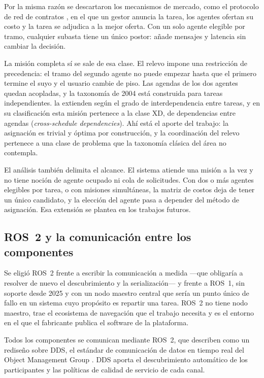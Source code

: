 Por la misma razón se descartaron los mecanismos de mercado, como el protocolo de red de contratos \autocite{smith1980contract}, en el que un gestor anuncia la tarea, los agentes ofertan su costo y la tarea se adjudica a la mejor oferta. Con un solo agente elegible por tramo, cualquier subasta tiene un único postor: añade mensajes y latencia sin cambiar la decisión.

La misión completa sí se sale de esa clase. El relevo impone una restricción de
precedencia: el tramo del segundo agente no puede empezar hasta que el primero
termine el suyo y el usuario cambie de piso. Las agendas de los dos agentes
quedan acopladas, y la taxonomía de 2004 está construida para tareas
independientes. \textcite{korsah2013comprehensive} la extienden según el grado
de interdependencia entre tareas, y en su clasificación esta misión pertenece a
la clase XD, de dependencias entre agendas (\textit{cross-schedule
dependencies}). Ahí está el aporte del trabajo: la asignación es trivial y óptima
por construcción, y la coordinación del relevo pertenece a una clase de problema
que la taxonomía clásica del área no contempla.

El análisis también delimita el alcance. El sistema atiende una misión a la vez y
no tiene noción de agente ocupado ni cola de solicitudes. Con dos o más agentes
elegibles por tarea, o con misiones simultáneas, la matriz de costos deja de
tener un único candidato, y la elección del agente pasa a depender del método de
asignación. Esa
extensión se plantea en los trabajos futuros.

\subsection{ROS~2 y la comunicación entre los componentes}
\label{sec:teo-ros2}

Se eligió ROS~2 frente a escribir la comunicación a medida ---que obligaría a
resolver de nuevo el descubrimiento y la serialización--- y frente a ROS~1, sin
soporte desde 2025 y con un nodo maestro central que sería un punto único de
fallo en un sistema cuyo propósito es repartir una tarea. ROS~2 no tiene nodo
maestro, trae el ecosistema de navegación que el trabajo necesita y es el entorno
en el que el fabricante publica el software de la plataforma.

Todos los componentes se comunican mediante ROS~2, que
\textcite{macenski2022ros2} describen como un rediseño sobre DDS, el estándar de
comunicación de datos en tiempo real del Object Management Group
\autocite{omg2015dds}. DDS aporta el descubrimiento automático de los
participantes y las políticas de calidad de servicio de cada canal.


